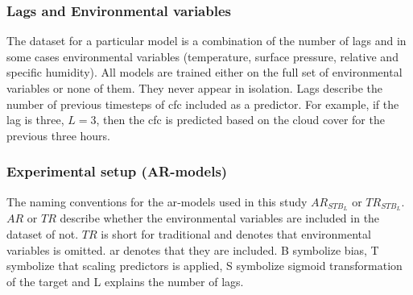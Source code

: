 \subsubsection{Lags and Environmental variables}
The dataset for a particular model is a combination of the number of lags and in some cases environmental variables (temperature, surface pressure, relative and specific humidity). All models are trained either on the full set of environmental variables or none of them. %
They never appear in isolation. Lags describe the number of previous timesteps of \acrshort{cfc} included as a predictor. For example, if the lag is three, $L=3$, then the \acrshort{cfc} is predicted based on the cloud cover for the previous three hours.


\subsubsection{Experimental setup (AR-models)}
The naming conventions for the \acrshort{ar}-models used in this study $AR_{STB_L}$ or $TR_{STB_L}$. $AR$ or $TR$ describe whether the environmental variables are included in the dataset of not. $TR$ is short for traditional and denotes that environmental variables is omitted. \acrshort{ar} denotes that they are included. B symbolize bias, T symbolize that scaling predictors is applied, S symbolize sigmoid transformation of the target and L explains the number of lags.  

